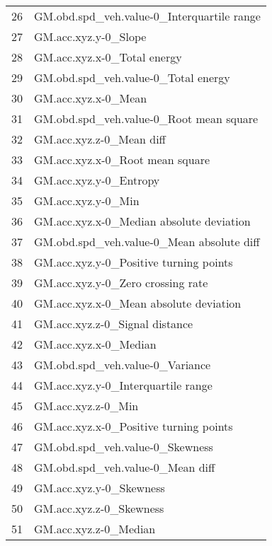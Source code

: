 \begin{tabular}{ll}
26  &        GM.obd.spd\_veh.value-0\_Interquartile range \\
27  &                              GM.acc.xyz.y-0\_Slope \\
28  &                       GM.acc.xyz.x-0\_Total energy \\
29  &               GM.obd.spd\_veh.value-0\_Total energy \\
30  &                               GM.acc.xyz.x-0\_Mean \\
31  &           GM.obd.spd\_veh.value-0\_Root mean square \\
32  &                          GM.acc.xyz.z-0\_Mean diff \\
33  &                   GM.acc.xyz.x-0\_Root mean square \\
34  &                            GM.acc.xyz.y-0\_Entropy \\
35  &                                GM.acc.xyz.y-0\_Min \\
36  &          GM.acc.xyz.x-0\_Median absolute deviation \\
37  &         GM.obd.spd\_veh.value-0\_Mean absolute diff \\
38  &            GM.acc.xyz.y-0\_Positive turning points \\
39  &                 GM.acc.xyz.y-0\_Zero crossing rate \\
40  &            GM.acc.xyz.x-0\_Mean absolute deviation \\
41  &                    GM.acc.xyz.z-0\_Signal distance \\
42  &                             GM.acc.xyz.x-0\_Median \\
43  &                   GM.obd.spd\_veh.value-0\_Variance \\
44  &                GM.acc.xyz.y-0\_Interquartile range \\
45  &                                GM.acc.xyz.z-0\_Min \\
46  &            GM.acc.xyz.x-0\_Positive turning points \\
47  &                   GM.obd.spd\_veh.value-0\_Skewness \\
48  &                  GM.obd.spd\_veh.value-0\_Mean diff \\
49  &                           GM.acc.xyz.y-0\_Skewness \\
50  &                           GM.acc.xyz.z-0\_Skewness \\
51  &                             GM.acc.xyz.z-0\_Median \\

\end{tabular}
